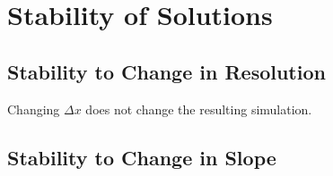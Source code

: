 \section{Stability of Solutions}
\subsection{Stability to Change in Resolution}
Changing $\Delta x$ does not change the resulting simulation.
\subsection{Stability to Change in Slope}

